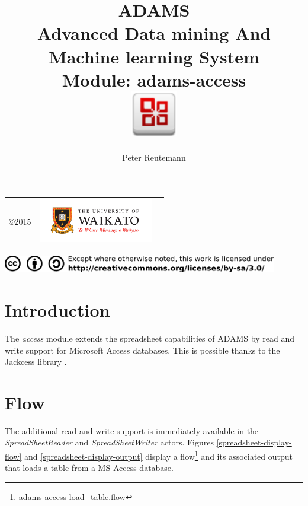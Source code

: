 \documentclass[a4paper]{book}
\title{
  \textbf{ADAMS} \\
  {\Large \textbf{A}dvanced \textbf{D}ata mining \textbf{A}nd \textbf{M}achine
  learning \textbf{S}ystem} \\
  {\Large Module: adams-access} \\
  \vspace{1cm}
  \includegraphics[width=2cm]{images/access-module.png} \\
}
\author{
  Peter Reutemann
}
\begin{document}
\begin{titlepage}
\maketitle

\thispagestyle{empty}
\center
\begin{table}[b]
	\begin{tabular}{c l l}
		\parbox[c][2cm]{2cm}{\copyright 2015} &
		\parbox[c][2cm]{5cm}{\includegraphics[width=5cm]{images/coat_of_arms.pdf}} \\
	\end{tabular}
	\includegraphics[width=12cm]{images/cc.png} \\
\end{table}

\end{titlepage}

\tableofcontents
\listoffigures

\chapter{Introduction}
The \textit{access} module extends the spreadsheet capabilities of ADAMS by read
and write support for Microsoft Access databases. This is possible thanks to the
Jackcess library \cite{jackcess}.

\chapter{Flow}
The additional read and write support is immediately available in the 
\textit{SpreadSheetReader} and \textit{SpreadSheetWriter} actors.
Figures \ref{spreadsheet-display-flow} and \ref{spreadsheet-display-output}
display a flow\footnote{adams-access-load\_table.flow} and its associated
output that loads a table from a MS Access database.
\end{document}
